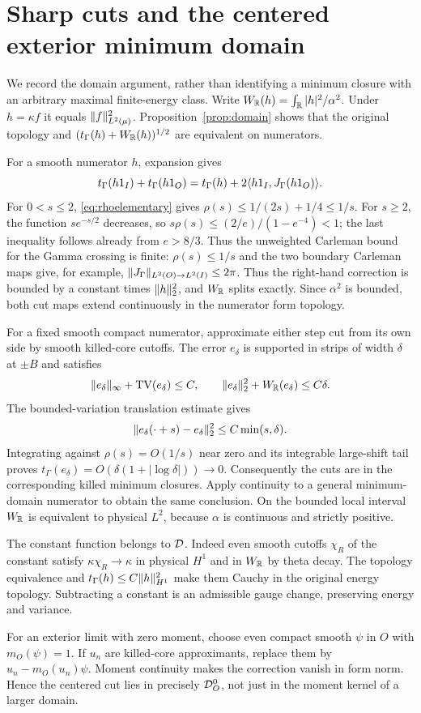 \section{Sharp cuts and the centered exterior minimum domain}\label{app:cuts}
We record the domain argument, rather than identifying a minimum
closure with an arbitrary maximal finite-energy class.
Write $W_\mathbb R(h)=\int_\mathbb R |h|^2/\alpha^2$. Under $h=\kappa f$ it equals
$\lVert f\rVert_{L^2(\mu)}^2$. Proposition~\ref{prop:domain}
shows that the original topology and
$(t_\Gamma(h)+W_\mathbb R(h))^{1/2}$ are equivalent on numerators.

For a smooth numerator $h$, expansion gives
\[
 t_\Gamma(h1_I)+t_\Gamma(h1_O)
 =t_\Gamma(h)+2\langle h1_I,J_\Gamma(h1_O)\rangle.
\]
For $0<s\le2$, \eqref{eq:rhoelementary} gives
$\rho(s)\le1/(2s)+1/4\le1/s$. For $s\ge2$, the function
$se^{-s/2}$ decreases, so
$s\rho(s)\le(2/e)/(1-e^{-4})<1$; the last inequality follows already
from $e>8/3$. Thus the unweighted Carleman bound for the Gamma crossing
is finite: $\rho(s)\le1/s$ and the two boundary Carleman maps give,
for example, $\lVert J_\Gamma\rVert_{L^2(O)\to L^2(I)}\le2\pi$.
Thus the right-hand correction is bounded by a constant times
$\lVert h\rVert_2^2$, and $W_\mathbb R$ splits exactly. Since $\alpha^2$ is bounded,
both cut maps extend continuously in the numerator form topology.

For a fixed smooth compact numerator, approximate either step cut from
its own side by smooth killed-core cutoffs. The error $e_\delta$ is
supported in strips of width $\delta$ at $\pm B$ and satisfies
\[
 \lVert e_\delta\rVert_\infty+\operatorname{TV}(e_\delta)\le C,
 \qquad\lVert e_\delta\rVert_2^2+W_\mathbb R(e_\delta)\le C\delta.
\]
The bounded-variation translation estimate gives
\[
 \lVert e_\delta(\cdot+s)-e_\delta\rVert_2^2\le C\min(s,\delta).
\]
Integrating against $\rho(s)=O(1/s)$ near zero and its integrable
large-shift tail proves
$t_\Gamma(e_\delta)=O(\delta(1+|\log\delta|))\to0$.
Consequently the cuts are in the corresponding killed minimum closures.
Apply continuity to a general minimum-domain numerator to obtain the
same conclusion. On the bounded local interval $W_\mathbb R$ is equivalent
to physical $L^2$, because $\alpha$ is continuous and strictly positive.

The constant function belongs to $\mathcal D$. Indeed even smooth cutoffs
$\chi_R$ of the constant satisfy $\kappa\chi_R\to\kappa$ in physical
$H^1$ and in $W_\mathbb R$ by theta decay. The topology equivalence and
$t_\Gamma(h)\le C\lVert h\rVert_{H^1}^2$ make them Cauchy in the original
energy topology. Subtracting a constant is an admissible gauge change,
preserving energy and variance.

For an exterior limit with zero moment, choose even compact smooth
$\psi$ in $O$ with $m_O(\psi)=1$. If $u_n$ are killed-core approximants,
replace them by $u_n-m_O(u_n)\psi$. Moment continuity makes the
correction vanish in form norm. Hence the centered cut lies in
precisely $\mathcal D_O^0$, not just in the moment kernel of a larger domain.

